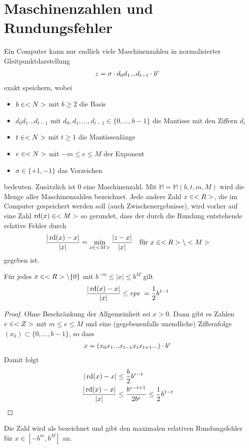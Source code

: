 \section{Maschinenzahlen und Rundungsfehler}

Ein Computer kann nur endlich viele Maschinenzahlen in normalisierter Gleitpunktdarstellung 
\begin{align}
	z = \sigma\cdot d_0d_1...d_{t-1}\cdot b^e\notag
\end{align}
exakt speichern, wobei
\begin{itemize}
	\item $b\in<N>$ mit $b\ge 2$ die Basis
	\item $d_0d_1...d_{t-1}$ mit $d_0,d_1,...,d_{t-1}\in\{0,...,b-1\}$ die Mantisse mit den Ziffern $d_i$
	\item $t\in<N>$ mit $t\ge 1$ die Mantissenlänge
	\item $e\in<N>$ mit $-m\le e\le M$ der Exponent
	\item $\sigma\in\{+1,-1\}$ das Vorzeichen
\end{itemize}
bedeuten. Zusätzlich ist 0 eine Maschinenzahl. Mit $\mathbb{M}=\mathbb{M}(b,t,m,M)$ wird die Menge aller Maschinenzahlen bezeichnet. Jede andere Zahl $x\in<R>$, die im Computer gespeichert werden soll (auch Zwischenergebnisse), wird vorher auf eine Zahl $\operatorname{rd}(x)\in<M>$ so gerundet, dass der durch die Rundung entstehende relative Fehler durch
\begin{align}
	\frac{\vert\operatorname{rd}(x)-x\vert}{\vert x\vert} = \min\limits_{z\in<M>}\frac{\vert z-x\vert}{\vert x\vert}\quad\text{für } x\in<R>\setminus<M>\notag
\end{align}
gegeben ist. 

\begin{lemma}
	Für jedes $x\in<R>\backslash\{0\}$ mit $b^{-m}\le \vert x\vert\le b^M$ gilt
	\begin{align}
		\frac{\vert\operatorname{rd}(x)-x\vert}{\vert x\vert} \le \text{\textit{eps }} = \frac{1}{2}b^{1-t}\notag
	\end{align}
\end{lemma}
\begin{proof}
	Ohne Beschränkung der Allgemeinheit sei $x>0$. Dann gibt es Zahlen $e\in<Z>$ mit $m\le e\le M$ und eine (gegebenenfalls unendliche) Ziffernfolge $(x_k)\subset \{0,...,b-1\}$, so dass 
	\begin{align}
		x = (x_0x_1...x_{t-1}x_tx_{t+1}...)\cdot b^e\notag
	\end{align}
	Damit folgt
	\begin{align}
		\vert\operatorname{rd}(x)-x\vert &\le \frac{b}{2}b^{e-t} \notag \\
		\frac{\vert\operatorname{rd}(x)-x\vert}{\vert x\vert} &\le \frac{b^{e-t+1}}{2b^e}\le \frac{1}{2}b^{1-t} \notag
	\end{align}
\end{proof}

Die Zahl \eps wird als  bezeichnet und gibt den maximalen relativen Rundungsfehler für $x\in [-b^m,b^M]$ an.